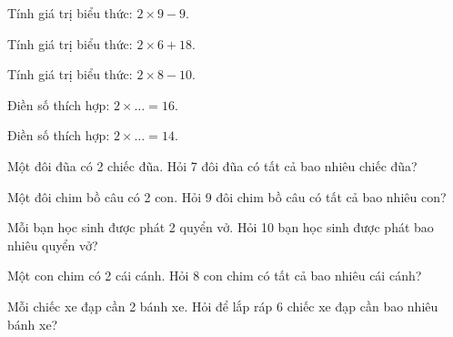 \begin{ex}
Tính giá trị biểu thức: $2 \times 9 - 9$.
\end{ex}

\begin{ex}
Tính giá trị biểu thức: $2 \times 6 + 18$.
\end{ex}

\begin{ex}
Tính giá trị biểu thức: $2 \times 8 - 10$.
\end{ex}

\begin{ex}
Điền số thích hợp: $2 \times \dots = 16$.
\end{ex}

\begin{ex}
Điền số thích hợp: $2 \times \dots = 14$.
\end{ex}

\begin{ex}
Một đôi đũa có 2 chiếc đũa. Hỏi 7 đôi đũa có tất cả bao nhiêu chiếc đũa?
\end{ex}

\begin{ex}
Một đôi chim bồ câu có 2 con. Hỏi 9 đôi chim bồ câu có tất cả bao nhiêu con?
\end{ex}

\begin{ex}
Mỗi bạn học sinh được phát 2 quyển vở. Hỏi 10 bạn học sinh được phát bao nhiêu quyển vở?
\end{ex}

\begin{ex}
Một con chim có 2 cái cánh. Hỏi 8 con chim có tất cả bao nhiêu cái cánh?
\end{ex}

\begin{ex}
Mỗi chiếc xe đạp cần 2 bánh xe. Hỏi để lắp ráp 6 chiếc xe đạp cần bao nhiêu bánh xe?
\end{ex}

